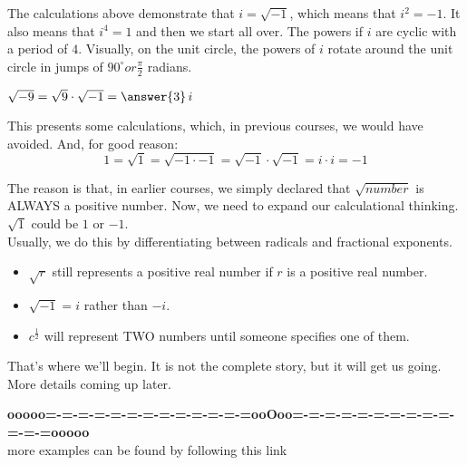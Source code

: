 \documentclass{ximera}
\begin{document}
The calculations above demonstrate that $i = \sqrt{-1}$, which means that $i^2 = -1$.  It also means that $i^4 = 1$ and then we start all over.  The powers if $i$ are cyclic with a period of $4$.  Visually, on the unit circle, the powers of $i$ rotate around the unit circle in jumps of $90^{\circ} or \frac{\pi}{2}$ radians.

\begin{question}


$\sqrt{-9} = \sqrt{9} \cdot \sqrt{-1} =  \answer{3} \, i$

\end{question}

This presents some calculations, which, in previous courses, we would have avoided. And, for good reason:\\

\[  1 = \sqrt{1} = \sqrt{-1 \cdot -1} = \sqrt{-1} \cdot \sqrt{-1} = i \cdot i = -1   \]


The reason is that, in earlier courses, we simply declared that $\sqrt{number}$ is ALWAYS a positive number.  Now, we need to expand our calculational thinking. $\sqrt{1}$ could be $1$ or $-1$. \\

Usually, we do this by differentiating between radicals and fractional exponents.\\

\begin{itemize}
\item $\sqrt{r}$ still represents a positive real number if $r$ is a positive real number.
\item $\sqrt{-1} = i$ rather than $-i$.
\item $c^{\tfrac{1}{2}}$ will represent TWO numbers until someone specifies one of them.
\end{itemize}

That's where we'll begin.  It is not the complete story, but it will get us going.  More details coming up later.





\begin{center}
\textbf{\textcolor{green!50!black}{ooooo=-=-=-=-=-=-=-=-=-=-=-=-=ooOoo=-=-=-=-=-=-=-=-=-=-=-=-=ooooo}} \\

more examples can be found by following this link\\ 

\end{center}
\end{document}
